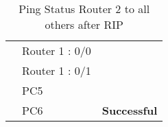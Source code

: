 \documentclass[a4paper,11pt]{article}
\begin{document}
\begin{enumerate}
\begin{table}[H]
\begin{tabular}{| m{10em}| m{10em}| m{10em} |}
                  \hhline{|>{\arrayrulecolor[rgb]{0.141,0.525,1}}->{\arrayrulecolor{black}}->{\arrayrulecolor[rgb]{0.42,0.988,0.827}}->{\arrayrulecolor{black}}|}
                  {\cellcolor[rgb]{0.141,0.525,1}}                                     & Router 1 : 0/0       & {\cellcolor[rgb]{0.42,0.988,0.827}}                                        \\
                  \hhline{|>{\arrayrulecolor[rgb]{0.141,0.525,1}}->{\arrayrulecolor{black}}->{\arrayrulecolor[rgb]{0.42,0.988,0.827}}->{\arrayrulecolor{black}}|}
                  {\cellcolor[rgb]{0.141,0.525,1}}                                     & Router 1 : 0/1       & {\cellcolor[rgb]{0.42,0.988,0.827}}                                        \\
                  \hhline{|>{\arrayrulecolor[rgb]{0.141,0.525,1}}->{\arrayrulecolor{black}}->{\arrayrulecolor[rgb]{0.42,0.988,0.827}}->{\arrayrulecolor{black}}|}
                  {\cellcolor[rgb]{0.141,0.525,1}}                                     & PC5                  & {\cellcolor[rgb]{0.42,0.988,0.827}}                                        \\
                  \hhline{|>{\arrayrulecolor[rgb]{0.141,0.525,1}}->{\arrayrulecolor{black}}->{\arrayrulecolor[rgb]{0.42,0.988,0.827}}->{\arrayrulecolor{black}}|}
                  \multirow{-10}{*}{{\cellcolor[rgb]{0.141,0.525,1}}\textbf{Router 2}} & PC6                  & \multirow{-10}{*}{{\cellcolor[rgb]{0.42,0.988,0.827}} \textbf{Successful}} \\
                  \hline
              \end{tabular}
              \caption{ Ping Status Router 2 to all others after RIP}
          \end{table}



          \begin{table}[H]
              \centering


\end{table}
\end{enumerate}
\end{document}
